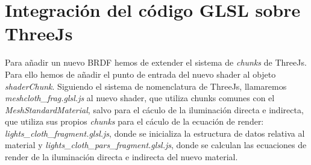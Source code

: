 





\section{Integraci\'on del c\'odigo GLSL sobre ThreeJs}
  Para a\~nadir un nuevo BRDF hemos de extender el sistema de \textit{chunks} de ThreeJs. Para ello hemos de a\~nadir el
  punto de entrada del nuevo shader al objeto \textit{shaderChunk}. Siguiendo el sistema de nomenclatura de ThreeJs,
  llamaremos \textit{meshcloth\_frag.glsl.js} al nuevo shader, que utiliza chunks comunes con el \textit{MeshStandardMaterial},
  salvo para el c\'aculo de la iluminaci\'on directa e indirecta, que utiliza sus propios \textit{chunks} para el c\'aculo
  de la ecuaci\'on de render: \textit{lights\_cloth\_fragment.glsl.js}, donde se inicializa la estructura de datos relativa
  al material y \textit{lights\_cloth\_pars\_fragment.glsl.js}, donde se calculan las ecuaciones de render de la iluminaci\'on
  directa e indirecta del nuevo material.

